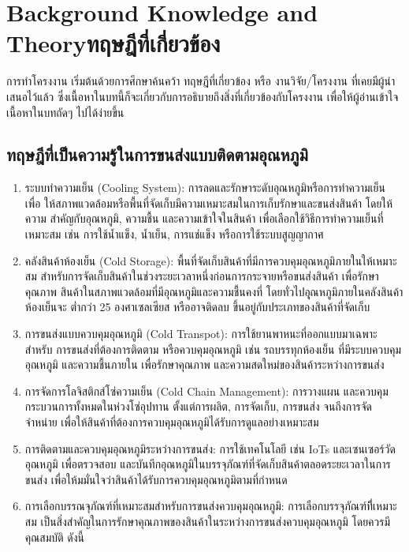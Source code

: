 \chapter{\ifenglish Background Knowledge and Theory\else ทฤษฎีที่เกี่ยวข้อง\fi}


การทำโครงงาน เริ่มต้นด้วยการศึกษาค้นคว้า ทฤษฎีที่เกี่ยวข้อง หรือ งานวิจัย/โครงงาน ที่เคยมีผู้นำเสนอไว้แล้ว ซึ่งเนื้อหาในบทนี้ก็จะเกี่ยวกับการอธิบายถึงสิ่งที่เกี่ยวข้องกับโครงงาน เพื่อให้ผู้อ่านเข้าใจเนื้อหาในบทถัดๆ ไปได้ง่ายขึ้น


\section{ทฤษฎีที่เป็นความรู้ในการขนส่งแบบติดตามอุณหภูมิ }

\begin{enumerate}
    \item ระบบทำความเย็น (Cooling System): การลดและรักษาระดับอุณหภูมิหรือการทำความเย็น เพื่อ	ให้สภาพแวดล้อมหรือพื้นที่จัดเก็บมีความเหมาะสมในการเก็บรักษาและขนส่งสินค้า โดยให้ความ		สำคัญกับอุณหภูมิ, ความชื้น และความเข้าใจในสินค้า เพื่อเลือกใช้วิธีการทำความเย็นที่เหมาะสม 	เช่น การใช้น้ำแข็ง, น้ำเย็น, การแช่แข็ง หรือการใช้ระบบสูญญากาศ 
    \item คลังสินค้าห้องเย็น (Cold Storage): พื้นที่จัดเก็บสินค้าที่มีการควบคุมอุณหภูมิภายในให้เหมาะสม 	สำหรับการจัดเก็บสินค้าในช่วงระยะเวลาหนึ่งก่อนการกระจายหรือขนส่งสินค้า เพื่อรักษาคุณภาพ	สินค้าในสภาพแวดล้อมที่มีอุณหภูมิและความชื้นคงที่ โดยทั่วไปอุุณหภูมิภายในคลังสินค้าห้องเย็นจะ	ต่ำกว่า 25 องศาเซลเซียส หรืออาจติดลบ ขึ้นอยู่กับประเภทของสินค้าที่จัดเก็บ
    \item การขนส่งแบบควบคุมอุณหภูมิ (Cold Transpot): การใช้ยานพาหนะที่ออกแบบมาเฉพาะสำหรับ	การขนส่งที่ต้องการติดตาม หรือควบคุมอุณหภูมิ เช่น รถบรรทุกห้องเย็น ที่มีระบบควบคุมอุณหภูมิ	และความชื้นภายใน เพื่อรักษาคุณภาพ และความสดใหม่ของสินค้าระหว่างการขนส่ง
    \item การจัดการโลจิสติกส์โซ่ความเย็น (Cold Chain Management): การวางแผน และควบคุม		กระบวนการทั้งหมดในห่วงโซ่อุปทาน ตั้งแต่การผลิต, การจัดเก็บ, การขนส่ง จนถึงการจัดจำหน่าย 	เพื่อให้สินค้าที่ต้องการควบคุมอุณหภูมิได้รับการดูแลอย่างเหมาะสม
    \item การติดตามและควบคุมอุณหภูมิระหว่างการขนส่ง: การใช้เทคโนโลยี เช่น IoTs และเซนเซอร์วัด		อุณหภูมิ เพื่อตรวจสอบ และบันทึกอุณหภูมิในบรรจุภัณฑ์ที่จัดเก็บสินค้าตลอดระยะเวลาในการขนส่ง	เพื่อให้มมั่นใจว่าสินค้าได้รับการควบคุมอุณหภูมิตามที่กำหนด
    \item การเลือกบรรณจุภัณฑ์ที่เหมาะสมสำหรับการขนส่งควบคุมอุณหภูมิ: การเลือกบรรจุภัณฑ์ที่ีเหมาะสม	เป็นสิ่งสำคัญในการรักษาคุณภาพของสินค้าในระหว่างการขนส่งควบคุมอุณหภูมิ โดยควรมีคุณสมบัติ	ดังนี้

\end{enumerate}
